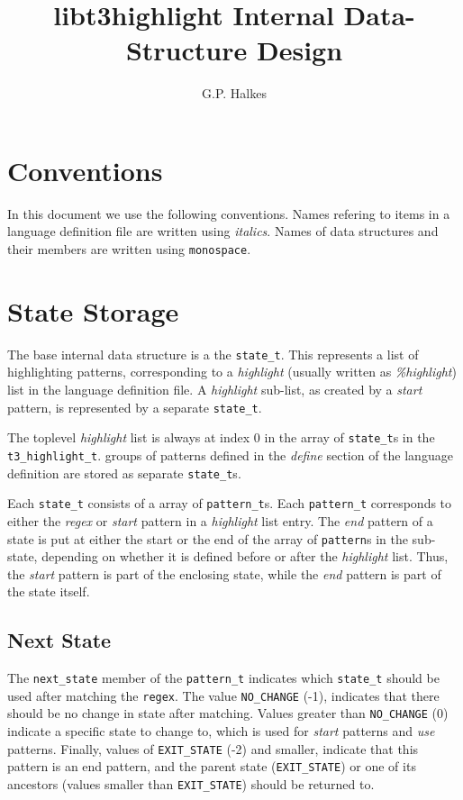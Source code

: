 \documentclass[a4paper]{article}
\title{libt3highlight Internal Data-Structure Design}
\author{G.P. Halkes}
\date{}
\begin{document}
\maketitle

\begin{multicols}{2}
\section{Conventions}
In this document we use the following conventions. Names refering to items in a
language definition file are written using {\it italics}. Names of data
structures and their members are written using {\tt monospace}.

\section{State Storage}
The base internal data structure is a the {\tt state_t}. This
represents a list of highlighting patterns, corresponding to a
{\it highlight} (usually written as {\it \%highlight}) list in the
language definition file. A {\it highlight} sub-list, as created by a
{\it start} pattern, is represented by a separate {\tt state_t}.

The toplevel {\it highlight} list is always at index 0 in the array of
{\tt state_t}s in the {\tt t3_highlight_t}. groups of patterns defined in the
{\it define} section of the language definition are stored as separate
{\tt state_t}s.

Each {\tt state_t} consists of a array of {\tt pattern_t}s. Each {\tt pattern_t}
corresponds to either the {\it regex} or {\it start} pattern in a
{\it highlight} list entry. The {\it end} pattern of a state is put at either
the start or the end of the array of {\tt pattern}s in the sub-state,
depending on whether it is defined before or after the {\it highlight} list.
Thus, the {\it start} pattern is part of the enclosing state, while the
{\it end} pattern is part of the state itself.

\subsection{Next State}
The {\tt next_state} member of the {\tt pattern_t} indicates which
{\tt state_t} should be used after matching the {\tt regex}. The value
{\tt NO_CHANGE} (-1), indicates that there should be no change in state after
matching. Values greater than {\tt NO_CHANGE} (0) indicate a specific state to
change to, which is used for {\it start} patterns and {\it use} patterns.
Finally, values of {\tt EXIT_STATE} (-2) and smaller, indicate that this
pattern is an end pattern, and the parent state ({\tt EXIT_STATE}) or one of
its ancestors (values smaller than {\tt EXIT_STATE}) should be returned to.


\end{multicols}
\end{document}
